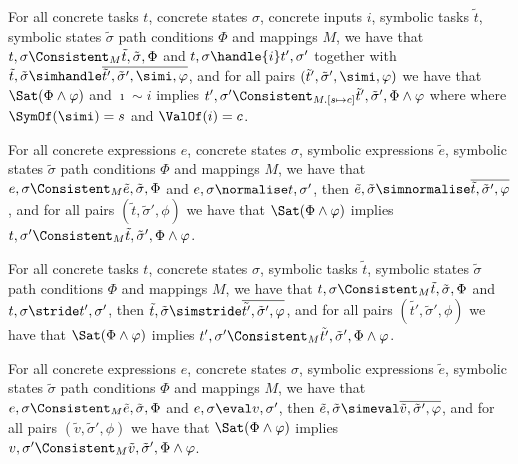 \begin{lemma}
  \label{lem:completeHandle}
  For all concrete tasks $t$, concrete states $\sigma$, concrete inputs $i$, symbolic tasks $\tilde{t}$, symbolic states $\tilde{\sigma}$ path conditions $\Phi$ and mappings $M$,
  we have that $t,\sigma\Consistent_{M}\tilde{t},\tilde{\sigma},\Phi$ and
  $t,\sigma\handle{i}t',\sigma'$ together with
  $\tilde{t},\tilde{\sigma}\simhandle\overline{\tilde{t}',\tilde{\sigma}',\simi,\phi}$,
  and for all pairs $(\tilde{t}',\tilde{\sigma}',\simi,\phi)$ we have that $\Sat(\Phi\land\phi)$ and $\imath\sim i$ implies $t',\sigma'\Consistent_{M.[s\mapsto c]}\tilde{t}',\tilde{\sigma}',\Phi\land\phi$ where where $\SymOf(\simi)=s$ and $\ValOf(i)=c$.
\end{lemma}

\begin{lemma}
  \label{lem:completeNormalise}
  For all concrete expressions $e$, concrete states $\sigma$, symbolic expressions $\tilde{e}$, symbolic states $\tilde{\sigma}$ path conditions $\Phi$ and mappings $M$,
  we have that $e,\sigma\Consistent_{M}\tilde{e},\tilde{\sigma},\Phi$
  and $e,\sigma\normalise t,\sigma'$,
  then $\tilde{e},\tilde{\sigma}\simnormalise\overline{\tilde{t},\tilde{\sigma}',\phi}$,
  and for all pairs $(\tilde{t},\tilde{\sigma}',\phi)$ we have that $\Sat(\Phi\land\phi)$ implies $t,\sigma'\Consistent_{M}\tilde{t},\tilde{\sigma}',\Phi\land\phi$.
\end{lemma}

\begin{lemma}
  \label{lem:completeStride}
  For all concrete tasks $t$, concrete states $\sigma$, symbolic tasks $\tilde{t}$, symbolic states $\tilde{\sigma}$ path conditions $\Phi$ and mappings $M$,
  we have that $t,\sigma\Consistent_{M}\tilde{t},\tilde{\sigma},\Phi$
  and $t,\sigma\stride t',\sigma'$,
  then $\tilde{t},\tilde{\sigma}\simstride\overline{\tilde{t'},\tilde{\sigma}',\phi}$,
  and for all pairs $(\tilde{t'},\tilde{\sigma}',\phi)$ we have that $\Sat(\Phi\land\phi)$ implies $t',\sigma'\Consistent_{M}\tilde{t'},\tilde{\sigma}',\Phi\land\phi$.
\end{lemma}

\begin{lemma}
  \label{lem:completeEval}
  For all concrete expressions $e$, concrete states $\sigma$, symbolic expressions $\tilde{e}$, symbolic states $\tilde{\sigma}$ path conditions $\Phi$ and mappings $M$,
  we have that $e,\sigma\Consistent_{M}\tilde{e},\tilde{\sigma},\Phi$
  and $e,\sigma\eval v,\sigma'$,
  then $\tilde{e},\tilde{\sigma}\simeval\overline{\tilde{v},\tilde{\sigma}',\phi}$,
  and for all pairs $(\tilde{v},\tilde{\sigma}',\phi)$ we have that $\Sat(\Phi\land\phi)$ implies $v,\sigma'\Consistent_{M}\tilde{v},\tilde{\sigma}',\Phi\land\phi$.
\end{lemma}

